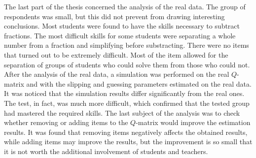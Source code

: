 \documentclass[english]{pwr_wmat_praca_dyplomowa}
\theoremstyle{plain}
\numberwithin{theorem}{chapter}
\theoremstyle{definition}
\numberwithin{theorem}{chapter}
\begin{document}
	The last part of the thesis concerned the analysis of the real data. The group of respondents was small, but this did not prevent from drawing interesting conclusions. Most students were found to have the skills necessary to subtract fractions. The most difficult skills for some students were separating a whole number from a fraction and simplifying before substracting. There were no items that turned out to be extremely difficult. Most of the item allowed for the separation of groups of students who could solve them from those who could not. After the analysis of the real data, a simulation was performed on the real $Q$-matrix and with the slipping and guessing parameters estimated on the real data. It was noticed that the simulation results differ significantly from the real ones. The test, in fact, was much more difficult, which confirmed that the tested group had mastered the required skills. The last subject of the analysis was to check whether removing or adding items to the $Q$-matrix would improve the estimation results. It was found that removing items negatively affects the obtained results, while adding items may improve the results, but the improvement is so small that it is not worth the additional involvement of students and teachers.
	
\end{document}
